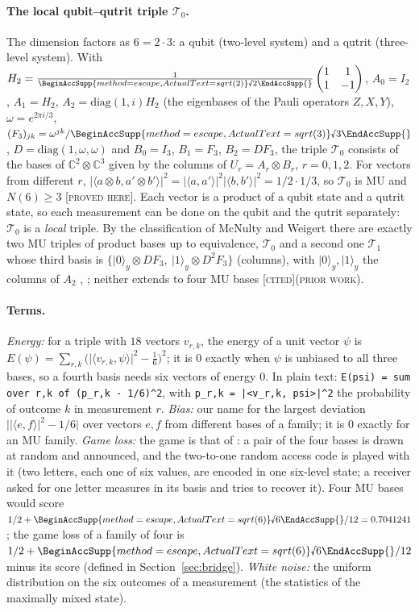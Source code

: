 \documentclass[11pt]{article}
\newcommand{\rnum}[1]{\BeginAccSupp{method=escape,ActualText=sqrt(#1)}\text{\textsurd}#1\EndAccSupp{}}
\newcommand{\rsix}{\rnum{6}}
\newcommand{\C}{\mathbb{C}}
\newcommand{\ip}[2]{\langle #1,#2\rangle}
\newcommand{\abs}[1]{\lvert #1\rvert}
\newcommand{\Tz}{\mathcal{T}_0}          %
\newcommand{\To}{\mathcal{T}_1}          %
\newcommand{\E}{E}                       %
\newcommand{\st}[1]{\textsc{[#1]}}
\newcommand{\stproved}{\st{proved here}}
\newcommand{\stcited}{\st{cited}}
\newcommand{\prior}{\textsc{(prior work)}}
\theoremstyle{definition}
\theoremstyle{remark}
\begin{document}
\paragraph{The local qubit--qutrit triple $\Tz$.} The dimension factors as $6=2\cdot3$: a qubit (two-level system) and a qutrit (three-level
system). With $H_2=\tfrac1{\rnum{2}}\begin{pmatrix}1&1\\1&-1\end{pmatrix}$, $A_0=I_2$, $A_1=H_2$,
$A_2=\mathrm{diag}(1,i)H_2$ (the eigenbases of the Pauli operators $Z,X,Y$), $\omega=e^{2\pi i/3}$,
$(F_3)_{jk}=\omega^{jk}/\rnum{3}$, $D=\mathrm{diag}(1,\omega,\omega)$ and $B_0=I_3$, $B_1=F_3$, $B_2=DF_3$, the
triple $\Tz$ consists of the bases of $\C^2\otimes\C^3$ given by the columns of
$U_r=A_r\otimes B_r$, $r=0,1,2$. For vectors from different $r$,
$\abs{\ip{a\otimes b}{a'\otimes b'}}^2=\abs{\ip a{a'}}^2\abs{\ip b{b'}}^2=1/2\cdot1/3$, so $\Tz$ is MU and
$N(6)\ge3$ \stproved. Each vector is a product of a qubit state and a qutrit state, so each measurement can be done on the qubit and
the qutrit separately: $\Tz$ is a \emph{local} triple. By the classification of McNulty and Weigert there are exactly two MU
triples of product bases up to equivalence, $\Tz$ and a second one $\To$ whose third basis is
$\{\lvert0\rangle_y\otimes DF_3,\ \lvert1\rangle_y\otimes D^2F_3\}$ (columns), with $\lvert0\rangle_y,\lvert1\rangle_y$
the columns of $A_2$ \cite[eq.~7.19]{MWreview}, \cite{MW12}; neither extends to four MU bases \cite{MW12}
\stcited \prior.

{\raggedright \paragraph{Terms.} \emph{Energy:} for a triple with $18$ vectors $v_{r,k}$, the energy of a unit vector $\psi$ is
$\E(\psi)=\sum_{r,k}\bigl(\abs{\ip{v_{r,k}}{\psi}}^2-\tfrac16\bigr)^2$; it is $0$ exactly when $\psi$ is unbiased to all
three bases, so a fourth basis needs six vectors of energy $0$. In plain text:
\texttt{E(psi) = sum over r,k of (p\_{r,k} -~1/6)\textasciicircum{}2}, with \texttt{p\_{r,k} = |<v\_{r,k}, psi>|\textasciicircum{}2} the probability of outcome $k$ in
measurement $r$. \emph{Bias:} our name for the largest deviation
$\bigl|\abs{\ip ef}^2-1/6\bigr|$ over vectors $e,f$ from different bases of a family; it is $0$ exactly for an MU family.
\emph{Game loss:} the game is that of \cite{ABMP}: a pair of the four bases is drawn at random and announced, and the
two-to-one random access code is played with it (two letters, each one of six values, are encoded in one six-level state;
a receiver asked for one letter measures in its basis and tries to recover it). Four MU bases would score
$1/2+\rsix/12=0.7041241$; the game loss of a family of four is $1/2+\rsix/12$ minus its score (defined in
Section~\ref{sec:bridge}). \emph{White noise:} the uniform distribution on the six outcomes of a measurement (the
statistics of the maximally mixed state).\par}
\end{document}
